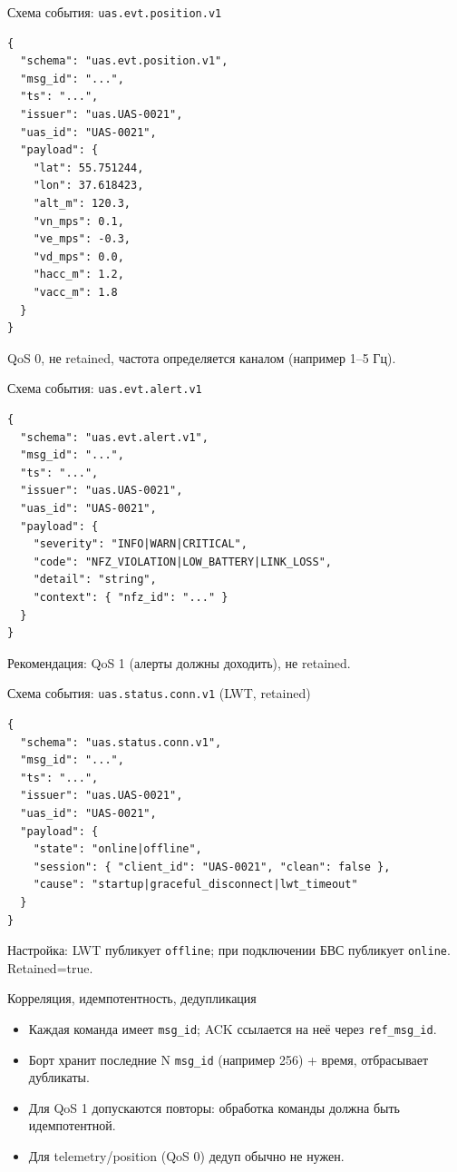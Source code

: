 \documentclass[aspectratio=169]{beamer}
\begin{document}
\begin{frame}[fragile]{Схема события: \texttt{uas.evt.position.v1}}
\begin{Verbatim}[fontsize=\scriptsize, baselinestretch=0.85]
{
  "schema": "uas.evt.position.v1",
  "msg_id": "...",
  "ts": "...",
  "issuer": "uas.UAS-0021",
  "uas_id": "UAS-0021",
  "payload": {
    "lat": 55.751244,
    "lon": 37.618423,
    "alt_m": 120.3,
    "vn_mps": 0.1,
    "ve_mps": -0.3,
    "vd_mps": 0.0,
    "hacc_m": 1.2,
    "vacc_m": 1.8
  }
}
\end{Verbatim}
QoS 0, не retained, частота определяется каналом (например 1--5 Гц).
\end{frame}

\begin{frame}[fragile]{Схема события: \texttt{uas.evt.alert.v1}}
\begin{Verbatim}[fontsize=\scriptsize, baselinestretch=0.85]
{
  "schema": "uas.evt.alert.v1",
  "msg_id": "...",
  "ts": "...",
  "issuer": "uas.UAS-0021",
  "uas_id": "UAS-0021",
  "payload": {
    "severity": "INFO|WARN|CRITICAL",
    "code": "NFZ_VIOLATION|LOW_BATTERY|LINK_LOSS",
    "detail": "string",
    "context": { "nfz_id": "..." }
  }
}
\end{Verbatim}
Рекомендация: QoS 1 (алерты должны доходить), не retained.
\end{frame}

\begin{frame}[fragile]{Схема события: \texttt{uas.status.conn.v1} (LWT, retained)}
\begin{Verbatim}[fontsize=\scriptsize, baselinestretch=0.85]
{
  "schema": "uas.status.conn.v1",
  "msg_id": "...",
  "ts": "...",
  "issuer": "uas.UAS-0021",
  "uas_id": "UAS-0021",
  "payload": {
    "state": "online|offline",
    "session": { "client_id": "UAS-0021", "clean": false },
    "cause": "startup|graceful_disconnect|lwt_timeout"
  }
}
\end{Verbatim}
Настройка: LWT публикует \texttt{offline}; при подключении БВС публикует \texttt{online}. Retained=true.
\end{frame}

\begin{frame}[fragile]{Корреляция, идемпотентность, дедупликация}
\begin{itemize}
  \item Каждая команда имеет \texttt{msg\_id}; ACK ссылается на неё через \texttt{ref\_msg\_id}.
  \item Борт хранит последние N \texttt{msg\_id} (например 256) + время, отбрасывает дубликаты.
  \item Для QoS 1 допускаются повторы: обработка команды должна быть идемпотентной.
  \item Для telemetry/position (QoS 0) дедуп обычно не нужен.
\end{itemize}
\end{frame}
\end{document}
